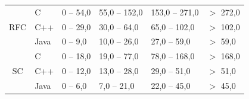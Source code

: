 \begin{table}[H]
\begin{tabular}{| c | l | l | l | l | l |}
\multirow{3}{*}{RFC}   & C      & 0 -- 54,0  & 55,0 -- 152,0 & 153,0 -- 271,0 & $>$ 272,0 \\
                       & C++     & 0 -- 29,0  & 30,0 -- 64,0  & 65,0 -- 102,0 & $>$ 102,0 \\
                       & Java      & 0 -- 9,0   & 10,0 -- 26,0 & 27,0 -- 59,0 & $>$ 59,0  \\
    \hline
\multirow{3}{*}{SC}    & C         & 0 -- 18,0  & 19,0 -- 77,0 & 78,0 -- 168,0 & $>$ 168,0 \\
                       & C++       & 0 -- 12,0  & 13,0 -- 28,0 & 29,0 -- 51,0  & $>$ 51,0  \\
                       & Java      & 0 -- 6,0   & 7,0 -- 21,0  & 22,0 -- 45,0  & $>$ 45,0  \\
    \hline
  \end{tabular}
  \label{valores-frequentes}
\end{table}

